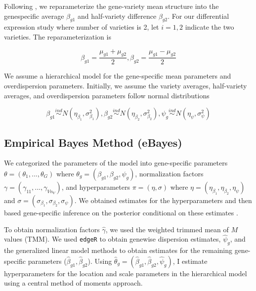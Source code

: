 Following \citep{ji2014estimation}, we reparameterize the gene-variety mean structure into the genespecific average $\beta_{g1}$ and half-variety difference $\beta_{g2}$. For our differential expression study where number of varieties is 2, let $i=1,2$ indicate the two varieties. The reparameterization is

\begin{equation}
\label{eq:3}
\beta_{g1} = \frac{\mu_{g1}+\mu_{g2}}{2}, \beta_{g2} = \frac{\mu_{g1}-\mu_{g2}}{2}
\end{equation}

We assume a hierarchical model for the gene-specific mean parameters and overdispersion parameters. Initially, we assume the variety averages, half-variety averages, and overdispersion parameters follow normal distributions

\begin{equation}
\label{eq:4}
\beta_{g1} \stackrel{ind}{\sim} N(\eta_{\beta_1}, \sigma^2_{\beta_1}), \beta_{g2} \stackrel{ind}{\sim} N(\eta_{\beta_2} , \sigma^2_{\beta_2}), \psi_g \stackrel{ind}{\sim} N(\eta_\psi, \sigma^2_\psi)
\end{equation}


\subsection{Empirical Bayes Method (eBayes)}

We categorized the parameters of the model into gene-specific parameters $\theta = (\theta_1, ..., \theta_G)$ where $\theta_g = (\beta_{g1}, \beta_{g2}, \psi_g)$, normalization factors $\gamma = (\gamma_{11}, ..., \gamma_{V n_V})$, and hyperparameters $\pi = (\eta, \sigma)$ where $\eta = (\eta_{\beta_1}, \eta_{\beta_2}, \eta_\psi)$ and $\sigma = (\sigma_{\beta_1}, \sigma_{\beta_2}, \sigma_\psi)$. We obtained estimates for the hyperparameters and then based gene-specific inference on the posterior conditional on these estimates \citep{niemi2015empirical}.

To obtain normalization factors $\hat{\gamma}$, we used the weighted trimmed mean of $M$ values (TMM). We used {\tt edgeR} to obtain genewise dispersion estimates, $\hat{\psi}_g$, and the generalized linear model methods to obtain estimates for the remaining gene-specific parameters ($\hat{\beta}_{g1}, \hat{\beta}_{g2}$)\citep{robinson2010scaling}. Using $\hat{\theta}_g = (\hat{\beta}_{g1} , \hat{\beta}_{g2}, \hat{\psi}_g)$, I estimate hyperparameters for the location and scale parameters in the hierarchical model using a central method of moments approach. 

